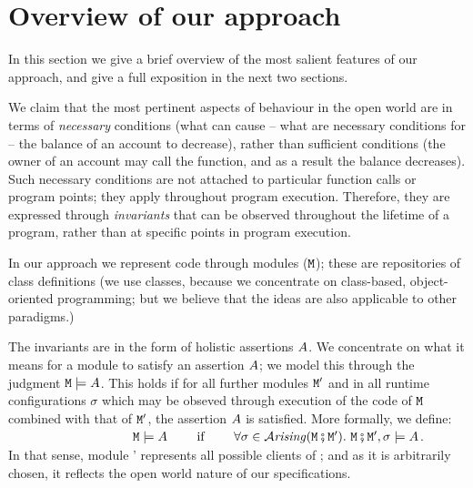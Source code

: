  
 


\section{Overview of our approach}

In this section we give a brief overview of the most salient features of our approach, and give a full exposition in the next two sections.


We claim that the most pertinent aspects of behaviour in the open world
are   in terms of  {\em necessary} conditions (\eg what can cause -- what are necessary conditions for --
 the balance of an account to decrease), rather than sufficient conditions (\eg the owner of an account may
 call the  function, and as a result the balance decreases).
Such necessary conditions are not attached to particular function calls or program points; they apply
throughout program execution.
Therefore, they are expressed through  {\em invariants} that can be observed throughout the lifetime of a program, rather than at specific points in program execution.

In our approach we represent code through modules (${\mbox{\tt{\ensuremath{{\mbox{\tt{M}}}}}}}$); these are repositories of class definitions (we use classes, because we concentrate on class-based, object-oriented programming; but we believe that the ideas are also applicable to other paradigms.)

The invariants are in the form of holistic assertions $A$. We concentrate on what it means for a module to satisfy an assertion $A$; we model this through the judgment ${\mbox{\tt{\ensuremath{{\mbox{\tt{M}}}}}}} \models A$.
This holds if for all further modules ${\mbox{\tt{\ensuremath{{\mbox{\tt{M}}}}}}}'$ and in  all runtime configurations $\sigma$ which may be obseved through execution of the code of ${\mbox{\tt{\ensuremath{{\mbox{\tt{M}}}}}}}$ combined with that of ${\mbox{\tt{\ensuremath{{\mbox{\tt{M}}}}}}}'$, the assertion $A$ is satisfied. More formally, we define:\\
$~ \strut  \hspace{1.3in} \M \models \A \ \ \  \ \ \ \mbox{             if               } \ \ \  \ \ \   \forall \sigma\in\Arising {\M \mkpair  {\M'}}. \ \M \mkpair  {\M'}, \sigma \models \A$.  \\
In that sense, module {\M'}  represents all possible clients of {\M}; and as it is arbitrarily chosen, it reflects the open world nature of our specifications.

